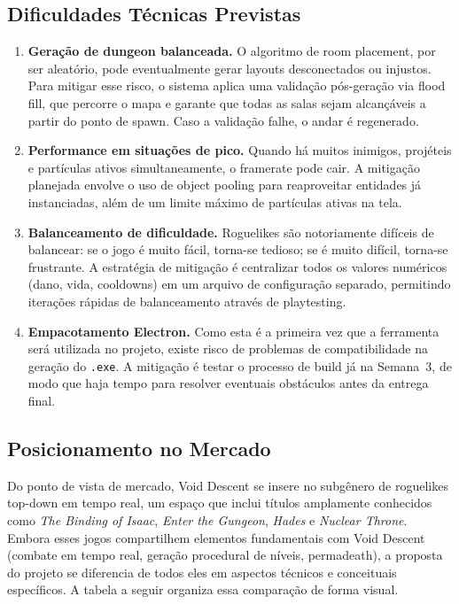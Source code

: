\documentclass[12pt, a4paper]{article}
\begin{document}
\subsection{Dificuldades T\'ecnicas Previstas}

\begin{enumerate}
  \item \textbf{Gera\c{c}\~ao de dungeon balanceada.} O algoritmo de room placement, por ser aleat\'orio, pode eventualmente gerar layouts desconectados ou injustos. Para mitigar esse risco, o sistema aplica uma valida\c{c}\~ao p\'os-gera\c{c}\~ao via flood fill, que percorre o mapa e garante que todas as salas sejam alcan\c{c}\'aveis a partir do ponto de spawn. Caso a valida\c{c}\~ao falhe, o andar \'e regenerado.
  \item \textbf{Performance em situa\c{c}\~oes de pico.} Quando h\'a muitos inimigos, proj\'eteis e part\'iculas ativos simultaneamente, o framerate pode cair. A mitiga\c{c}\~ao planejada envolve o uso de object pooling para reaproveitar entidades j\'a instanciadas, al\'em de um limite m\'aximo de part\'iculas ativas na tela.
  \item \textbf{Balanceamento de dificuldade.} Roguelikes s\~ao notoriamente dif\'iceis de balancear: se o jogo \'e muito f\'acil, torna-se tedioso; se \'e muito dif\'icil, torna-se frustrante. A estrat\'egia de mitiga\c{c}\~ao \'e centralizar todos os valores num\'ericos (dano, vida, cooldowns) em um arquivo de configura\c{c}\~ao separado, permitindo itera\c{c}\~oes r\'apidas de balanceamento atrav\'es de playtesting.
  \item \textbf{Empacotamento Electron.} Como esta \'e a primeira vez que a ferramenta ser\'a utilizada no projeto, existe risco de problemas de compatibilidade na gera\c{c}\~ao do \texttt{.exe}. A mitiga\c{c}\~ao \'e testar o processo de build j\'a na Semana~3, de modo que haja tempo para resolver eventuais obst\'aculos antes da entrega final.
\end{enumerate}

\subsection{Posicionamento no Mercado}

Do ponto de vista de mercado, Void Descent se insere no subg\^enero de roguelikes top-down em tempo real, um espa\c{c}o que inclui t\'itulos amplamente conhecidos como \textit{The Binding of Isaac}, \textit{Enter the Gungeon}, \textit{Hades} e \textit{Nuclear Throne}. Embora esses jogos compartilhem elementos fundamentais com Void Descent (combate em tempo real, gera\c{c}\~ao procedural de n\'iveis, permadeath), a proposta do projeto se diferencia de todos eles em aspectos t\'ecnicos e conceituais espec\'ificos. A tabela a seguir organiza essa compara\c{c}\~ao de forma visual.
\end{document}
